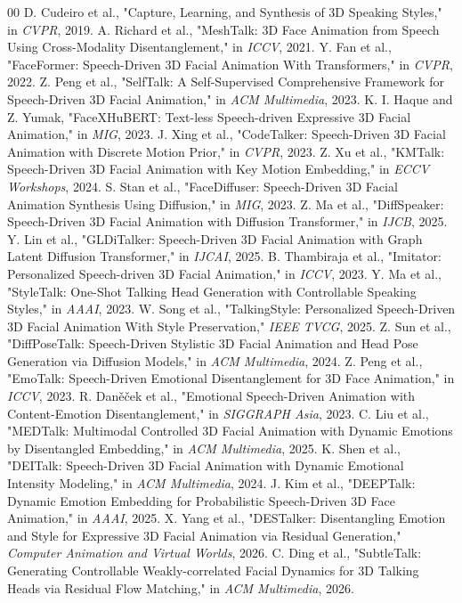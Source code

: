 \documentclass[conference]{IEEEtran}
\begin{document}
\begin{thebibliography}{00}
 D. Cudeiro et al., "Capture, Learning, and Synthesis of 3D Speaking Styles," in \emph{CVPR}, 2019.
 A. Richard et al., "MeshTalk: 3D Face Animation from Speech Using Cross-Modality Disentanglement," in \emph{ICCV}, 2021.
 Y. Fan et al., "FaceFormer: Speech-Driven 3D Facial Animation With Transformers," in \emph{CVPR}, 2022.
 Z. Peng et al., "SelfTalk: A Self-Supervised Comprehensive Framework for Speech-Driven 3D Facial Animation," in \emph{ACM Multimedia}, 2023.
 K. I. Haque and Z. Yumak, "FaceXHuBERT: Text-less Speech-driven Expressive 3D Facial Animation," in \emph{MIG}, 2023.
 J. Xing et al., "CodeTalker: Speech-Driven 3D Facial Animation with Discrete Motion Prior," in \emph{CVPR}, 2023.
 Z. Xu et al., "KMTalk: Speech-Driven 3D Facial Animation with Key Motion Embedding," in \emph{ECCV Workshops}, 2024.
 S. Stan et al., "FaceDiffuser: Speech-Driven 3D Facial Animation Synthesis Using Diffusion," in \emph{MIG}, 2023.
 Z. Ma et al., "DiffSpeaker: Speech-Driven 3D Facial Animation with Diffusion Transformer," in \emph{IJCB}, 2025.
 Y. Lin et al., "GLDiTalker: Speech-Driven 3D Facial Animation with Graph Latent Diffusion Transformer," in \emph{IJCAI}, 2025.
 B. Thambiraja et al., "Imitator: Personalized Speech-driven 3D Facial Animation," in \emph{ICCV}, 2023.
 Y. Ma et al., "StyleTalk: One-Shot Talking Head Generation with Controllable Speaking Styles," in \emph{AAAI}, 2023.
 W. Song et al., "TalkingStyle: Personalized Speech-Driven 3D Facial Animation With Style Preservation," \emph{IEEE TVCG}, 2025.
 Z. Sun et al., "DiffPoseTalk: Speech-Driven Stylistic 3D Facial Animation and Head Pose Generation via Diffusion Models," in \emph{ACM Multimedia}, 2024.
 Z. Peng et al., "EmoTalk: Speech-Driven Emotional Disentanglement for 3D Face Animation," in \emph{ICCV}, 2023.
 R. Dan\v{e}\v{c}ek et al., "Emotional Speech-Driven Animation with Content-Emotion Disentanglement," in \emph{SIGGRAPH Asia}, 2023.
 C. Liu et al., "MEDTalk: Multimodal Controlled 3D Facial Animation with Dynamic Emotions by Disentangled Embedding," in \emph{ACM Multimedia}, 2025.
 K. Shen et al., "DEITalk: Speech-Driven 3D Facial Animation with Dynamic Emotional Intensity Modeling," in \emph{ACM Multimedia}, 2024.
 J. Kim et al., "DEEPTalk: Dynamic Emotion Embedding for Probabilistic Speech-Driven 3D Face Animation," in \emph{AAAI}, 2025.
 X. Yang et al., "DESTalker: Disentangling Emotion and Style for Expressive 3D Facial Animation via Residual Generation," \emph{Computer Animation and Virtual Worlds}, 2026.
 C. Ding et al., "SubtleTalk: Generating Controllable Weakly-correlated Facial Dynamics for 3D Talking Heads via Residual Flow Matching," in \emph{ACM Multimedia}, 2026.
\end{thebibliography}
\end{document}
